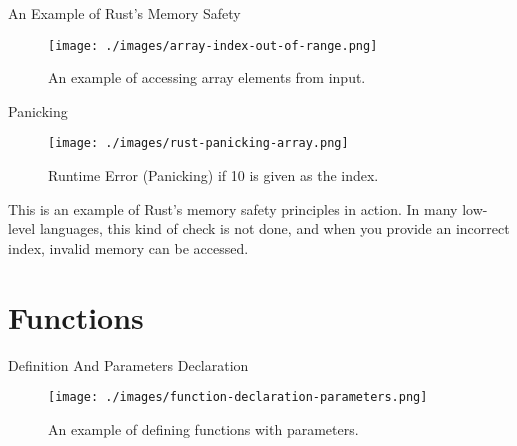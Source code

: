 \documentclass[10pt]{beamer}
\begin{document}
\begin{frame}{An Example of Rust's Memory Safety}
    \begin{figure}[htpb]
        \centering
        \texttt{[image: ./images/array-index-out-of-range.png]}
        \caption{An example of accessing array elements from input.\cite{rust-book}}
    \end{figure}
\end{frame}

\begin{frame}{Panicking}
    \begin{figure}[htpb]
        \centering
        \texttt{[image: ./images/rust-panicking-array.png]}
        \caption{Runtime Error (Panicking) if 10 is given as the index.\cite{rust-book}}
    \end{figure}

    This is an example of Rust’s memory safety principles in action. In many low-level languages, this kind of check is not done, and when you provide an incorrect index, invalid memory can be accessed.\cite{rust-book}

\end{frame}

\section{Functions}
\begin{frame}{Definition And Parameters Declaration}
    \begin{figure}[htpb]
        \centering
        \texttt{[image: ./images/function-declaration-parameters.png]}
        \caption{An example of defining functions with parameters.\cite{rust-book}}
    \end{figure}
\end{frame}
\end{document}
